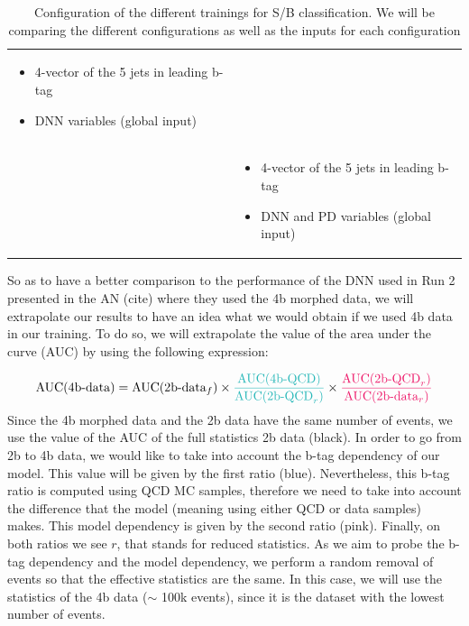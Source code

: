 \begin{table}[h!]
\begin{tabular}{|M{3cm}|M{10cm}|}
\begin{itemize}[itemsep=0.01em]
    \item 4-vector of the 5 jets in leading b-tag
    \item DNN variables (global input)
 \end{itemize} \\ 
   &  \begin{itemize}[itemsep=0.01em]
    \item 4-vector of the 5 jets in leading b-tag
    \item DNN and PD variables (global input)
 \end{itemize} \\
 \hline
\end{tabular}
\caption{Configuration of the different trainings for S/B classification. We will be comparing the different configurations as well as the inputs for each configuration}
\label{table: S/B trainings}
\end{table}

So as to have a better comparison to the performance of the DNN used in Run 2 presented in the AN (cite) where they used the 4b morphed data, we will extrapolate our results to have an idea what we would obtain if we used 4b data in our training. To do so, we will extrapolate the value of the area under the curve (AUC) by using the following expression:

\begin{equation}
    \text{AUC}(\text{4b-data})= \text{AUC}(\text{2b-data}_f) \times \textcolor{BlueGreen}{\frac{\text{AUC}(\text{4b-QCD})}{\text{AUC}(\text{2b-QCD}_r)}} \times \textcolor{WildStrawberry}{\frac{\text{AUC}(\text{2b-QCD}_r)}{\text{AUC}(\text{2b-data}_r)}}
    \label{eq: extrapolation}
\end{equation} 
\noindent Since the 4b morphed data and the 2b data have the same number of events, we use the value of the AUC of the full statistics 2b data (black). In order to go from 2b to 4b data, we would like to take into account the b-tag dependency of our model. This value will be given by the first ratio (\textcolor{BlueGreen}{blue}). Nevertheless, this b-tag ratio is computed using QCD MC samples, therefore we need to take into account the difference that the model (meaning using either QCD or data samples) makes. This model dependency is given by the second ratio (\textcolor{WildStrawberry}{pink}).  Finally, on both ratios we see $r$, that stands for reduced statistics. As we aim to probe the b-tag dependency and the model dependency, we perform a random removal of events so that the effective statistics are the same. In this case, we will use the statistics of the 4b data ($\sim$ 100k events), since it is the dataset with the lowest number of events.

